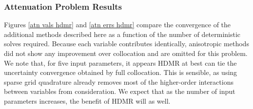 \documentclass[11pt]{article}
\begin{document}
\subsubsection{Attenuation Problem Results}
Figures \ref{atn vals hdmr} and \ref{atn errs hdmr} compare the convergence of the additional methods described here as a function of the number of deterministic solves required.  Because each variable contributes identically, anisotropic methods did not show any improvement over collocation and are omitted for this problem.  We note that, for five input parameters, it appears HDMR at best can tie the uncertainty convergence obtained by full collocation.  This is sensible, as using sparse grid quadrature already removes most of the higher-order interactions between variables from consideration.  We expect that as the number of input parameters increases, the benefit of HDMR will as well.
\end{document}
